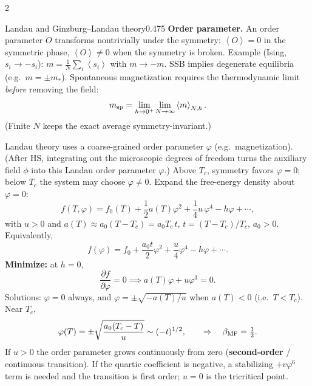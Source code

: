 \documentclass[8pt,a4paper]{extarticle}
\newcommand{\dd}{\,\mathrm d}
\newcommand{\avg}[1]{\left\langle #1\right\rangle}
\newcommand{\e}{\mathrm e}
\newcommand{\grad}{\boldsymbol\nabla}
\begin{document}
\begin{multicols*}{2}
\begin{mytikzbox}{Landau and Ginzburg--Landau theory}{0.475}
\textbf{Order parameter.} An order parameter $O$ transforms nontrivially under the
symmetry: $\avg O=0$ in the symmetric phase, $\avg O\neq0$ when the symmetry is
broken. Example (Ising, $s_i\to-s_i$): $m=\frac1N\sum_i\avg{s_i}$ with $m\to-m$.
SSB implies degenerate equilibria (e.g.\ $m=\pm m_*$). Spontaneous magnetization
requires the thermodynamic limit \emph{before} removing the field:
\[
m_{\rm sp}
=\lim_{h\to0^+}\lim_{N\to\infty}\avg{m}_{N,h}.
\]
(Finite $N$ keeps the exact average symmetry-invariant.)

Landau theory uses a coarse-grained order parameter $\varphi$ (e.g.\ magnetization).
(After HS, integrating out the microscopic degrees of freedom turns the auxiliary field
$\phi$ into this Landau order parameter $\varphi$.)
Above $T_c$, symmetry favors $\varphi=0$; below $T_c$ the system may choose $\varphi\neq0$.
Expand the free-energy density about $\varphi=0$:
\[
f(T,\varphi)=f_0(T)+\frac12 a(T)\varphi^2+\frac14 u\,\varphi^4-h\varphi+\cdots,
\]
with $u>0$ and $a(T)\approx a_0(T-T_c)=a_0 T_c\,t$, $t=(T-T_c)/T_c$, $a_0>0$.
Equivalently,
\[
f(\varphi)=f_0+\frac{a_0t}{2}\varphi^2+\frac u4\varphi^4-h\varphi+\cdots.
\]
\textbf{Minimize:} at $h=0$,
\[
\frac{\partial f}{\partial\varphi}=0
\implies a(T)\varphi+u\varphi^3=0.
\]
Solutions: $\varphi=0$ always, and
$\varphi=\pm\sqrt{-a(T)/u}$ when $a(T)<0$ (i.e.\ $T<T_c$).
Near $T_c$,
\[
\varphi(T)=\pm\sqrt{\frac{a_0(T_c-T)}{u}}
\sim(-t)^{1/2},
\qquad\Rightarrow\quad \beta_{\rm MF}=\tfrac12.
\]
If $u>0$ the order parameter grows continuously from zero
(\textbf{second-order} / continuous transition).
If the quartic coefficient is negative, a stabilizing $+v\varphi^6$ term is needed and the
transition is first order; $u=0$ is the tricritical point.


\end{mytikzbox}
\end{multicols*}
\end{document}
